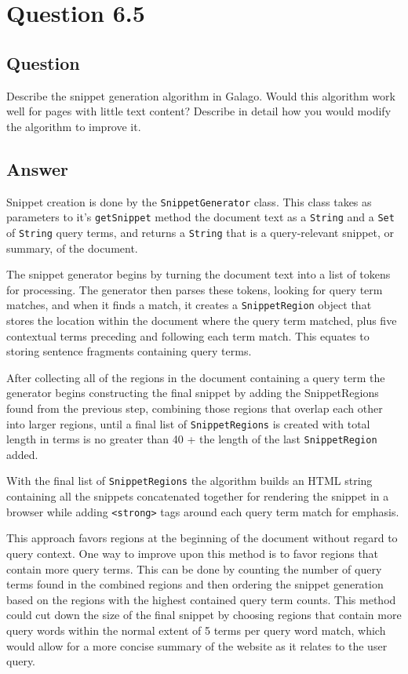 \section{Question 6.5}

\subsection{Question}
Describe the snippet generation algorithm in Galago. Would this algorithm
work well for pages with little text content? Describe in detail how you would
modify the algorithm to improve it.


\subsection{Answer}
Snippet creation is done by the \texttt{SnippetGenerator} class.  This class takes as parameters to it's \texttt{getSnippet} method the document text as a \texttt{String} and a \texttt{Set} of \texttt{String} query terms, and returns a \texttt{String} that is a query-relevant snippet, or summary, of the document.

The snippet generator begins by turning the document text into a list of tokens for processing.  The generator then parses these tokens, looking for query term matches, and when it finds a match, it creates a \texttt{SnippetRegion} object that stores the location within the document where the query term matched, plus five contextual terms preceding and following each term match.  This equates to storing sentence fragments containing query terms.

After collecting all of the regions in the document containing a query term the generator begins constructing the final snippet by adding the SnippetRegions found from the previous step, combining those regions that overlap each other into larger regions, until a final list of \texttt{SnippetRegions} is created with total length in terms is no greater than 40 + the length of the last \texttt{SnippetRegion} added.

With the final list of \texttt{SnippetRegions} the algorithm builds an HTML string containing all the snippets concatenated together for rendering the snippet in a browser while adding \texttt{<strong>} tags around each query term match for emphasis.

This approach favors regions at the beginning of the document without regard to query context.  One way to improve upon this method is to favor regions that contain more query terms.  This can be done by counting the number of query terms found in the combined regions and then ordering the snippet generation based on the regions with the highest contained query term counts.  This method could cut down the size of the final snippet by choosing regions that contain more query words within the normal extent of 5 terms per query word match, which would allow for a more concise summary of the website as it relates to the user query.